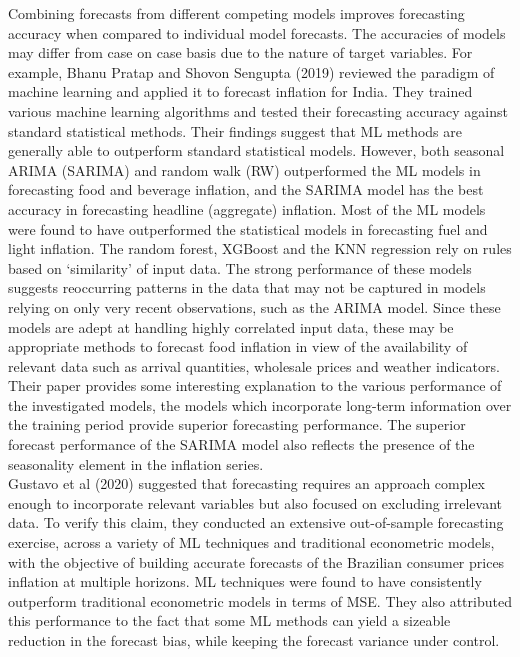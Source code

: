 \documentclass[12pt,italian, twoside]{report}
\begin{document}
Combining forecasts from different competing models improves forecasting accuracy when compared to individual model forecasts. The accuracies of models may differ from case on case basis due to the nature of target variables. For example, Bhanu Pratap and Shovon Sengupta (2019) reviewed the paradigm of machine learning and applied it to forecast inflation for India. They trained various machine learning algorithms and tested their forecasting accuracy against standard statistical methods. Their findings suggest that ML methods are generally able to outperform standard statistical models. However, both seasonal ARIMA (SARIMA) and random walk (RW) outperformed the ML models in forecasting food and beverage inflation, and the SARIMA model has the best accuracy in forecasting headline (aggregate) inflation. Most of the ML models were found to have outperformed the statistical models in forecasting fuel and light inflation. The random forest, XGBoost and the KNN regression rely on rules based on ‘similarity’ of input data. The strong performance of these models suggests reoccurring patterns in the data that may not be captured in models relying on only very recent observations, such as the ARIMA model. Since these models are adept at handling highly correlated input data, these may be appropriate methods to forecast food inflation in view of the availability of relevant data such as arrival quantities, wholesale prices and weather indicators. Their paper provides some interesting explanation to the various performance of the investigated models, the models which incorporate long-term information over the training period provide superior forecasting performance. The superior forecast performance of the SARIMA model also reflects the presence of the seasonality element in the inflation series.\\
Gustavo et al (2020) suggested that forecasting requires an approach complex enough to incorporate relevant variables but also focused on excluding irrelevant data. To verify this claim, they conducted an extensive out-of-sample forecasting exercise, across a variety of ML techniques and traditional econometric models, with the objective of building accurate forecasts of the Brazilian consumer prices inflation at multiple horizons. ML techniques were found to have consistently outperform traditional econometric models in terms of MSE. They also attributed this performance to the fact that some ML methods can yield a sizeable reduction in the forecast bias, while keeping the forecast variance under control.\\
\end{document}
